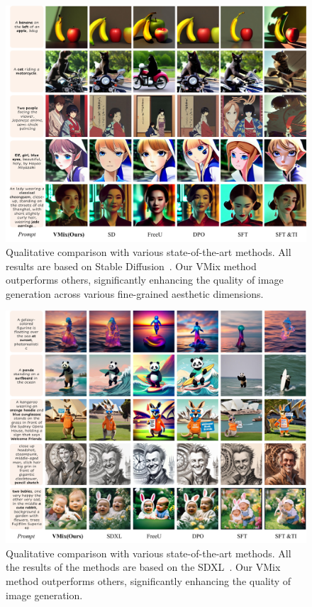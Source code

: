 \begin{figure}[ht]
	\centerline{\includegraphics[scale=0.706]{vmix_compare_sd15.pdf}}
	\caption{Qualitative comparison with various state-of-the-art methods. All results are based on Stable Diffusion~\cite{rombach2022high}. Our VMix method outperforms others, significantly enhancing the quality of image generation across various fine-grained aesthetic dimensions.}
	\label{fig4}
\end{figure}

\begin{figure}[ht]
	\centerline{\includegraphics[scale=0.71]{vmix_compare_sdxl2.pdf}}
	\caption{Qualitative comparison with various state-of-the-art methods. All the results of the methods are based on the SDXL~\cite{podell2023sdxl}. Our VMix method outperforms others, significantly enhancing the quality of image generation.}
	\label{fig5}
\end{figure}

